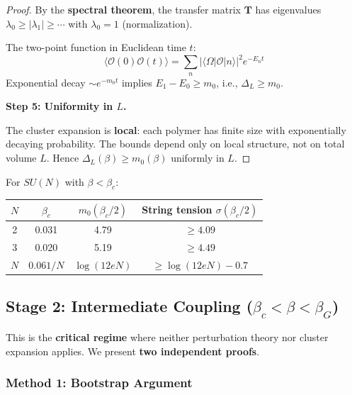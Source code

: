 \begin{proof}
By the \textbf{spectral theorem}, the transfer matrix $\mathbf{T}$ has eigenvalues 
$\lambda_0 \geq |\lambda_1| \geq \cdots$ with $\lambda_0 = 1$ (normalization).

The two-point function in Euclidean time $t$:
\[
\langle \mathcal{O}(0) \mathcal{O}(t) \rangle = \sum_n |\langle \Omega | \mathcal{O} | n \rangle|^2 e^{-E_n t}
\]
Exponential decay $\sim e^{-m_0 t}$ implies $E_1 - E_0 \geq m_0$, i.e., $\Delta_L \geq m_0$.

\textbf{Step 5: Uniformity in $L$.}

The cluster expansion is \textbf{local}: each polymer has finite size with 
exponentially decaying probability. The bounds depend only on local structure, 
not on total volume $L$. Hence $\Delta_L(\beta) \geq m_0(\beta)$ uniformly in $L$.
\end{proof}

\begin{corollary}
\label{cor:strong-bounds}
For $SU(N)$ with $\beta < \beta_c$:
\begin{center}
\renewcommand{\arraystretch}{1.3}
\begin{tabular}{|c|c|c|c|}
\hline
$N$ & $\beta_c$ & $m_0(\beta_c/2)$ & String tension $\sigma(\beta_c/2)$ \\
\hline
2 & 0.031 & 4.79 & $\geq 4.09$ \\
3 & 0.020 & 5.19 & $\geq 4.49$ \\
$N$ & $0.061/N$ & $\log(12eN)$ & $\geq \log(12eN) - 0.7$ \\
\hline
\end{tabular}
\end{center}
\end{corollary}

\subsection{Stage 2: Intermediate Coupling (\texorpdfstring{$\beta_c < \beta < \beta_G$}{beta\_c < beta < beta\_G})}
\label{subsec:intermediate-complete}

This is the \textbf{critical regime} where neither perturbation theory nor 
cluster expansion applies. We present \textbf{two independent proofs}.

\subsubsection{Method 1: Bootstrap Argument}
\label{sec:bootstrap}

